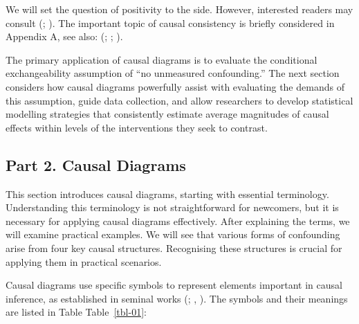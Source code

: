 \documentclass[
  singlecolumn]{article}
\begin{document}
We will set the question of positivity to the side. However, interested
readers may consult (;
). The important
topic of causal consistency is briefly considered in Appendix A, see
also: (;
;
).

The primary application of causal diagrams is to evaluate the
conditional exchangeability assumption of ``no unmeasured confounding.''
The next section considers how causal diagrams powerfully assist with
evaluating the demands of this assumption, guide data collection, and
allow researchers to develop statistical modelling strategies that
consistently estimate average magnitudes of causal effects within levels
of the interventions they seek to contrast.

\subsection{Part 2. Causal Diagrams}\label{part-2.-causal-diagrams}

This section introduces causal diagrams, starting with essential
terminology. Understanding this terminology is not straightforward for
newcomers, but it is necessary for applying causal diagrams effectively.
After explaining the terms, we will examine practical examples. We will
see that various forms of confounding arise from four key causal
structures. Recognising these structures is crucial for applying them in
practical scenarios.

Causal diagrams use specific symbols to represent elements important in
causal inference, as established in seminal works
(;
, ).
The symbols and their meanings are listed in Table Table~\ref{tbl-01}:
\end{document}
